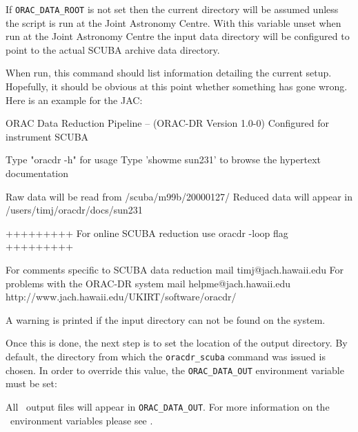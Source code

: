 \documentclass[twoside,11pt,nolof]{starlink}
\providecommand{\oracdr}{\xref{\textsc{orac-dr}}{sun230}{}}
\begin{document}
\begin{terminalv}
\end{terminalv}

If \texttt{ORAC\_DATA\_ROOT} is not set then the current directory
will be assumed unless the script is run at the Joint Astronomy Centre.
With this variable unset when run at the Joint Astronomy Centre
the input data directory will be configured to point to the actual
SCUBA archive data directory.

When run, this command should list information detailing the
current setup. Hopefully, it should be obvious at this point
whether something has gone wrong. Here is an example for the JAC:

\begin{terminalv}

     ORAC Data Reduction Pipeline -- (ORAC-DR Version 1.0-0)
     Configured for instrument SCUBA

     Type "oracdr -h" for usage
     Type 'showme sun231' to browse the hypertext documentation


 Raw data will be read from /scuba/m99b/20000127/
 Reduced data will appear in /users/timj/oracdr/docs/sun231

+++++++++ For online SCUBA reduction use oracdr -loop flag +++++++++

For comments specific to SCUBA data reduction mail timj@jach.hawaii.edu
For problems with the ORAC-DR system mail helpme@jach.hawaii.edu
         http://www.jach.hawaii.edu/UKIRT/software/oracdr/

\end{terminalv}

A warning is printed if the input directory can not be found
on the system.

Once this is done, the next step is to set the location of the
output directory. By default, the directory from which the
\texttt{oracdr\_scuba} command was issued is chosen. In order
to override this value, the \texttt{ORAC\_DATA\_OUT} environment
variable must be set:

\begin{terminalv}
\end{terminalv}

All \oracdr\ output files will appear in \texttt{ORAC\_DATA\_OUT}.
For more information on the \oracdr\ environment variables please
see .
\end{document}
